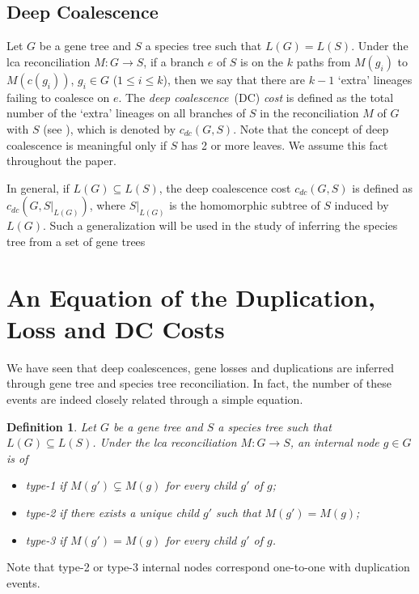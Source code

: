\documentclass[9.5pt,journal,letterpaper,compsoc]{IEEEtran}
\newtheorem{definition}{\bf Definition}[section]
\begin{document}
\subsection{Deep Coalescence}

Let $G$ be a gene tree and $S$ a species tree such that $L(G)=L(S)$.
Under the lca reconciliation $M: G\rightarrow S$, if a branch $e$ of
$S$ is on the $k$ paths from $M(g_i)$ to $M(c(g_i))$, $g_i\in G$
($1\leq i\leq k$),  then we say that there are $k-1$ `extra'
lineages failing to coalesce on  $e$. The {\it deep
coalescence}~(DC) {\it cost} is defined as the total number of the
`extra' lineages on all branches of $S$ in the reconciliation $M$ of
$G$ with $S$ (see \cite{Maddison_SysBiol_97}), which is denoted by
$c_{dc}(G, S)$. Note that the concept of deep coalescence is
meaningful only if $S$ has 2 or more leaves. We assume this fact
throughout the paper.

In general, if $L(G)\subseteq L(S)$, the deep coalescence cost
$c_{dc}(G, S)$ is defined as $c_{dc}(G, S|_{L(G)})$, where
$S|_{L(G)}$ is the homomorphic subtree of $S$ induced by $L(G)$.
Such a generalization will be used in the study of inferring the
species tree from a set of gene trees


\section{An Equation of the Duplication, Loss  and  DC Costs}

 We have seen that  deep coalescences, gene losses and duplications
are inferred through gene tree and species tree reconciliation.
In fact,  the number of these events
 are indeed closely related through a simple equation.


\begin{definition}
 Let $G$ be a gene tree and $S$ a species tree such that $L(G)\subseteq L(S)$.
Under the lca  reconciliation ${M}: G\rightarrow S$,
an internal node  $g\in G$ is of
 \begin{itemize}
  \item  type-1 if $M(g') \subsetneq M(g)$ for every child $g'$ of $g$;
  \item  type-2 if there exists a unique child $g'$ such that $M(g') =
M(g)$;
  \item type-3  if $M(g')=M(g)$ for  every child $g'$ of $g$.
 \end{itemize}
\end{definition}

 Note that type-2 or type-3 internal nodes correspond one-to-one with duplication events.
\end{document}
